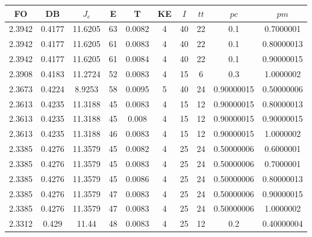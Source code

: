 \begin{table}[h!]
    \footnotesize
    \begin{center}
        \begin{tabular}{|c|c|c|c|c|c|c|c|c|c|}
        \hline
            {\bf FO} & {\bf DB} & $J_e$ & {\bf E} & {\bf T} & {\bf KE} & $I$ & $tt$ & $pc$ & $pm$ \\
        \hline
        \hline
            2.3942 & 0.4177  & 11.6205 & 63 & 0.0082 & 4 & 40 & 22 & 0.1 & 0.7000001\\
        \hline
        \hline
            2.3942 & 0.4177  & 11.6205 & 61 & 0.0083 & 4 & 40 & 22 & 0.1 & 0.80000013\\
        \hline
        \hline
            2.3942 & 0.4177  & 11.6205 & 61 & 0.0084 & 4 & 40 & 22 & 0.1 & 0.90000015\\
        \hline
        \hline
            2.3908 & 0.4183  & 11.2724 & 52 & 0.0083 & 4 & 15 & 6 & 0.3 & 1.0000002\\
        \hline
        \hline
            2.3673 & 0.4224  & 8.9253 & 58 & 0.0095 & 5 & 40 & 24 & 0.90000015 & 0.50000006\\
        \hline
        \hline
            2.3613 & 0.4235  & 11.3188 & 45 & 0.0083 & 4 & 15 & 12 & 0.90000015 & 0.80000013\\
        \hline
        \hline
            2.3613 & 0.4235  & 11.3188 & 45 & 0.008 & 4 & 15 & 12 & 0.90000015 & 0.90000015\\
        \hline
        \hline
            2.3613 & 0.4235  & 11.3188 & 46 & 0.0083 & 4 & 15 & 12 & 0.90000015 & 1.0000002\\
        \hline
        \hline
            2.3385 & 0.4276  & 11.3579 & 45 & 0.0082 & 4 & 25 & 24 & 0.50000006 & 0.6000001\\
        \hline
        \hline
            2.3385 & 0.4276  & 11.3579 & 45 & 0.0083 & 4 & 25 & 24 & 0.50000006 & 0.7000001\\
        \hline
        \hline
            2.3385 & 0.4276  & 11.3579 & 45 & 0.0086 & 4 & 25 & 24 & 0.50000006 & 0.80000013\\
        \hline
        \hline
            2.3385 & 0.4276  & 11.3579 & 47 & 0.0083 & 4 & 25 & 24 & 0.50000006 & 0.90000015\\
        \hline
        \hline
            2.3385 & 0.4276  & 11.3579 & 47 & 0.0083 & 4 & 25 & 24 & 0.50000006 & 1.0000002\\
        \hline
        \hline
            2.3312 & 0.429  & 11.44 & 48 & 0.0083 & 4 & 25 & 12 & 0.2 & 0.40000004\\

\end{tabular}
\end{center}
\end{table}
